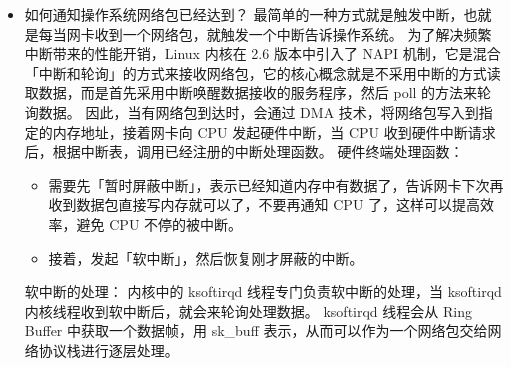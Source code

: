 \documentclass[11pt]{article}
\begin{document}
\begin{itemize}
\item 如何通知操作系统网络包已经达到？
最简单的一种方式就是触发中断，也就是每当网卡收到一个网络包，就触发一个中断告诉操作系统。
为了解决频繁中断带来的性能开销，Linux 内核在 2.6 版本中引入了 NAPI 机制，它是混合「中断和轮询」的方式来接收网络包，它的核心概念就是不采用中断的方式读取数据，而是首先采用中断唤醒数据接收的服务程序，然后 poll 的方法来轮询数据。
因此，当有网络包到达时，会通过 DMA 技术，将网络包写入到指定的内存地址，接着网卡向 CPU 发起硬件中断，当 CPU 收到硬件中断请求后，根据中断表，调用已经注册的中断处理函数。
硬件终端处理函数：
\begin{itemize}
\item 需要先「暂时屏蔽中断」，表示已经知道内存中有数据了，告诉网卡下次再收到数据包直接写内存就可以了，不要再通知 CPU 了，这样可以提高效率，避免 CPU 不停的被中断。
\item 接着，发起「软中断」，然后恢复刚才屏蔽的中断。
\end{itemize}
软中断的处理：
内核中的 ksoftirqd 线程专门负责软中断的处理，当 ksoftirqd 内核线程收到软中断后，就会来轮询处理数据。
ksoftirqd 线程会从 Ring Buffer 中获取一个数据帧，用 sk\_buff 表示，从而可以作为一个网络包交给网络协议栈进行逐层处理。
\end{itemize}
\end{document}
